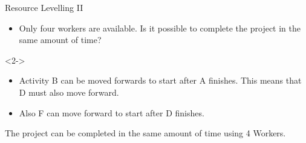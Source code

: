 \documentclass[8pt]{beamer}
\begin{document}
\begin{frame}{Resource Levelling II}
\begin{problem}
	\begin{itemize}
		\item Only four workers are available. Is it possible to complete the project in the same amount of time?
	\end{itemize}
\end{problem}
	\begin{solution}<2->
		\begin{itemize}
			\item Activity B can be moved forwards to start after A finishes. This means that D must also move forward.
			\item Also F can move forward to start after D finishes.
		\end{itemize}

		\begin{minipage}{.6\linewidth}
	\centering
\end{minipage}%
\begin{minipage}{.4\linewidth}
		\begin{center}
\end{center}
\end{minipage}
The project can be completed in the same amount of time using 4 Workers.
	\end{solution}
\end{frame}
\end{document}
